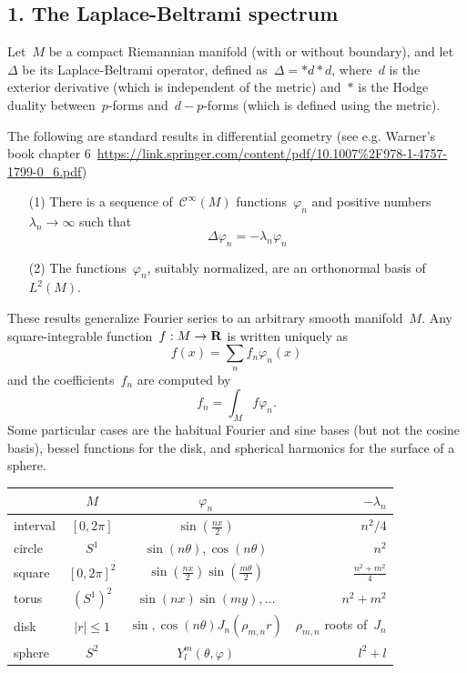 \subsection{1. The Laplace-Beltrami spectrum}

Let~$M$ be a compact Riemannian manifold (with or without boundary), and
let~$\Delta$ be its Laplace-Beltrami operator, defined
as~$\Delta=*d*d$, where~$d$ is the exterior derivative (which is independent
of the metric) and~$*$ is the Hodge duality between~$p$-forms
and~$d-p$-forms (which is defined using the metric).

The following are standard results in differential geometry (see e.g.
Warner's book chapter
6~\url{https://link.springer.com/content/pdf/10.1007\%2F978-1-4757-1799-0_6.pdf})

\begin{itemize}
	\item[(1)] There is a sequence of~$\mathcal{C}^\infty(M)$
		functions~$\varphi_n$ and positive
		numbers~$\lambda_n\to\infty$ such that
		$$\Delta\varphi_n=-\lambda_n\varphi_n$$
	\item[(2)] The functions~$\varphi_n$, suitably normalized, are an
		orthonormal basis of~$L^2(M)$.
\end{itemize}

These results generalize Fourier series to an arbitrary smooth manifold~$M$.
Any square-integrable function~$f:M\to\mathbf{R}$ is written uniquely as
$$f(x)=\sum_nf_n\varphi_n(x)$$ and the coefficients~$f_n$ are computed by
$$f_n=\int_Mf\varphi_n.$$  Some particular cases are the habitual Fourier and
sine bases (but not the cosine basis), bessel functions for the disk, and
spherical harmonics for the surface of a sphere.

\begin{tabular}{lccr}
	&$M$ & $\varphi_n$ & $-\lambda_n$ \\
	\hline
	interval & $[0,2\pi]$ & $\sin\left(\frac{nx}{2}\right)$ & $n^2/4$ \\
	circle & $S^1$ & $\sin(n\theta),\cos(n\theta)$ & $n^2$ \\
	square & $[0,2\pi]^2$ &
	$\sin\left(\frac{nx}{2}\right)\sin\left(\frac{m\theta}{2}\right)$ &
	$\frac{n^2+m^2}{4}$ \\
	torus & $(S^1)^2$ & $\sin(nx)\sin(my),\ldots$ & $n^2+m^2$ \\
	disk & $|r|\le1$ & $\sin,\cos(n\theta)J_n(\rho_{m,n}r)$ &
	$\rho_{m,n}$ roots of~$J_n$ \\
	sphere & $S^2$ & $Y^m_l(\theta,\varphi)$ & $l^2+l$
\end{tabular}

